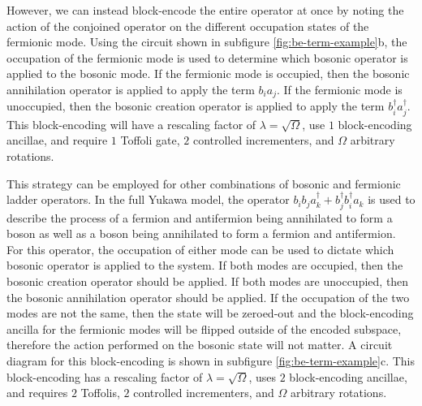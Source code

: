However, we can instead block-encode the entire operator at once by noting the action of the conjoined operator on the different occupation states of the fermionic mode.
Using the circuit shown in subfigure \ref{fig:be-term-example}b, the occupation of the fermionic mode is used to determine which bosonic operator is applied to the bosonic mode.
If the fermionic mode is occupied, then the bosonic annihilation operator is applied to apply the term $b_i a_j$.
If the fermionic mode is unoccupied, then the bosonic creation operator is applied to apply the term $b_i^\dagger a_j^\dagger$.
This block-encoding will have a rescaling factor of $\lambda = \sqrt{\Omega}$, use $1$ block-encoding ancillae, and require $1$ Toffoli gate, $2$ controlled incrementers, and $\Omega$ arbitrary rotations.

This strategy can be employed for other combinations of bosonic and fermionic ladder operators.
In the full Yukawa model, the operator $b_i b_j a_k^\dagger + b_j^\dagger b_i^\dagger a_k$ is used to describe the process of a fermion and antifermion being annihilated to form a boson as well as a boson being annihilated to form a fermion and antifermion.
For this operator, the occupation of either mode can be used to dictate which bosonic operator is applied to the system.
If both modes are occupied, then the bosonic creation operator should be applied.
If both modes are unoccupied, then the bosonic annihilation operator should be applied.
If the occupation of the two modes are not the same, then the state will be zeroed-out and the block-encoding ancilla for the fermionic modes will be flipped outside of the encoded subspace, therefore the action performed on the bosonic state will not matter.
A circuit diagram for this block-encoding is shown in subfigure \ref{fig:be-term-example}c.
This block-encoding has a rescaling factor of $\lambda = \sqrt{\Omega}$, uses $2$ block-encoding ancillae, and requires $2$ Toffolis, $2$ controlled incrementers, and $\Omega$ arbitrary rotations.


